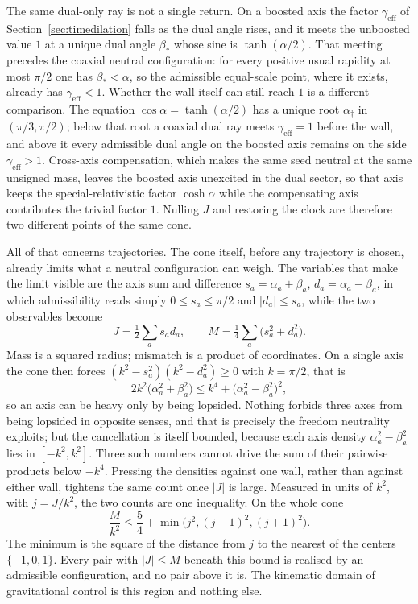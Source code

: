 \documentclass[a4paper]{article}
\begin{document}
The same dual-only ray is not a single return. On a boosted axis the factor $\gamma_{\mathrm{eff}}$ of Section~\ref{sec:timedilation} falls as the dual angle rises, and it meets the unboosted value $1$ at a unique dual angle $\beta_\ast$ whose sine is $\tanh(\alpha/2)$. That meeting precedes the coaxial neutral configuration: for every positive usual rapidity at most $\pi/2$ one has $\beta_\ast<\alpha$, so the admissible equal-scale point, where it exists, already has $\gamma_{\mathrm{eff}}<1$. Whether the wall itself can still reach $1$ is a different comparison. The equation $\cos\alpha=\tanh(\alpha/2)$ has a unique root $\alpha_\dagger$ in $(\pi/3,\pi/2)$; below that root a coaxial dual ray meets $\gamma_{\mathrm{eff}}=1$ before the wall, and above it every admissible dual angle on the boosted axis remains on the side $\gamma_{\mathrm{eff}}>1$. Cross-axis compensation, which makes the same seed neutral at the same unsigned mass, leaves the boosted axis unexcited in the dual sector, so that axis keeps the special-relativistic factor $\cosh\alpha$ while the compensating axis contributes the trivial factor $1$. Nulling $J$ and restoring the clock are therefore two different points of the same cone.

All of that concerns trajectories. The cone itself, before any trajectory is chosen, already limits what a neutral configuration can weigh. The variables that make the limit visible are the axis sum and difference $s_a=\alpha_a+\beta_a$, $d_a=\alpha_a-\beta_a$, in which admissibility reads simply $0\le s_a\le\pi/2$ and $|d_a|\le s_a$, while the two observables become
\[
J=\tfrac12\sum_a s_ad_a,\qquad M=\tfrac14\sum_a\bigl(s_a^2+d_a^2\bigr).
\]
Mass is a squared radius; mismatch is a product of coordinates. On a single axis the cone then forces $(k^2-s_a^2)(k^2-d_a^2)\ge 0$ with $k=\pi/2$, that is
\[
2k^2\bigl(\alpha_a^2+\beta_a^2\bigr)\le k^4+\bigl(\alpha_a^2-\beta_a^2\bigr)^2 ,
\]
so an axis can be heavy only by being lopsided. Nothing forbids three axes from being lopsided in opposite senses, and that is precisely the freedom neutrality exploits; but the cancellation is itself bounded, because each axis density $\alpha_a^2-\beta_a^2$ lies in $[-k^2,k^2]$. Three such numbers cannot drive the sum of their pairwise products below $-k^4$. Pressing the densities against one wall, rather than against either wall, tightens the same count once $|J|$ is large. Measured in units of $k^2$, with $j=J/k^2$, the two counts are one inequality. On the whole cone
\begin{equation}
\label{eq:control-envelope}
\frac{M}{k^2}\le \frac54+\min\bigl(j^2,(j-1)^2,(j+1)^2\bigr).
\end{equation}
The minimum is the square of the distance from $j$ to the nearest of the centers $\{-1,0,1\}$. Every pair with $|J|\le M$ beneath this bound is realised by an admissible configuration, and no pair above it is. The kinematic domain of gravitational control is this region and nothing else.
\end{document}
